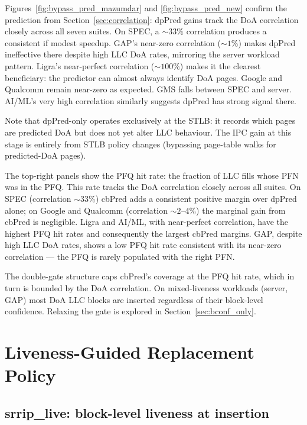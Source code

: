 \documentclass[12pt]{article}
\begin{document}
Figures~\ref{fig:bypass_pred_mazumdar} and \ref{fig:bypass_pred_new}
confirm the prediction from Section~\ref{sec:correlation}: dpPred gains
track the DoA correlation closely across all seven suites.
On SPEC, a ${\sim}33\%$ correlation produces a consistent if modest
speedup.
GAP's near-zero correlation (${\sim}1\%$) makes dpPred ineffective there
despite high LLC DoA rates, mirroring the server workload pattern.
Ligra's near-perfect correlation (${\sim}100\%$) makes it the clearest
beneficiary: the predictor can almost always identify DoA pages.
Google and Qualcomm remain near-zero as expected.
GMS falls between SPEC and server.
AI/ML's very high correlation similarly suggests dpPred has strong signal
there.

Note that dpPred-only operates exclusively at the STLB: it records which
pages are predicted DoA but does not yet alter LLC behaviour.
The IPC gain at this stage is entirely from STLB policy changes
(bypassing page-table walks for predicted-DoA pages).

The top-right panels show the PFQ hit rate: the fraction of LLC fills
whose PFN was in the PFQ.
This rate tracks the DoA correlation closely across all suites.
On SPEC (correlation ${\sim}33\%$) cbPred adds a consistent positive
margin over dpPred alone; on Google and Qualcomm (correlation
${\sim}2$--$4\%$) the marginal gain from cbPred is negligible.
Ligra and AI/ML, with near-perfect correlation, have the highest PFQ
hit rates and consequently the largest cbPred margins.
GAP, despite high LLC DoA rates, shows a low PFQ hit rate consistent
with its near-zero correlation --- the PFQ is rarely populated with
the right PFN.

The double-gate structure caps cbPred's coverage at the PFQ hit rate,
which in turn is bounded by the DoA correlation.
On mixed-liveness workloads (server, GAP) most DoA LLC blocks are
inserted regardless of their block-level confidence.
Relaxing the gate is explored in Section~\ref{sec:bconf_only}.

\section{Liveness-Guided Replacement Policy}
\label{sec:replacement}

\subsection{srrip\_live: block-level liveness at insertion}
\end{document}
